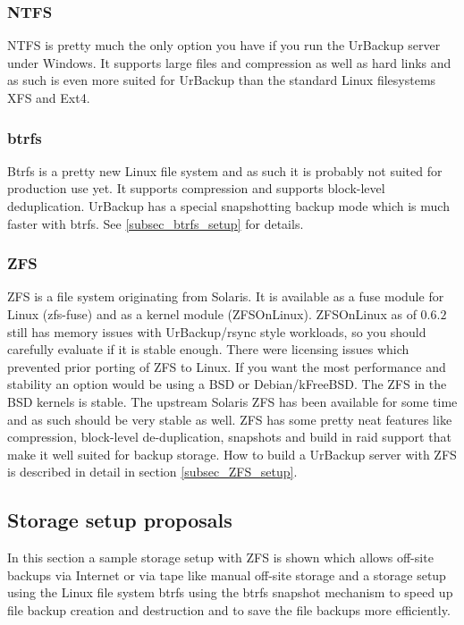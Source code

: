 \documentclass[a4paper,10pt]{article}
\begin{document}
\subsubsection{NTFS}

NTFS is pretty much the only option you have if you run the UrBackup server under Windows. It supports large files and compression as well as hard links and as such is even more suited for UrBackup than the standard Linux filesystems XFS and Ext4. 

\subsubsection{btrfs}

Btrfs is a pretty new Linux file system and as such it is probably not suited for production use yet.
It supports compression and supports block-level deduplication. UrBackup has a special snapshotting backup
mode which is much faster with btrfs. See \ref{subsec_btrfs_setup} for details.

\subsubsection{ZFS}

ZFS is a file system originating from Solaris.
It is available as a fuse module for Linux (zfs-fuse) and as a kernel module (ZFSOnLinux). ZFSOnLinux
as of $0.6.2$ still has memory issues with UrBackup/rsync style workloads, so you should carefully evaluate
if it is stable enough.
There were licensing issues which prevented prior porting of ZFS to Linux.
If you want the most performance and stability an option would be using a BSD or Debian/kFreeBSD.
The ZFS in the BSD kernels is stable. 
The upstream Solaris ZFS has been available for some time and as such should be very stable as well.
ZFS has some pretty neat features like compression, block-level de-duplication, snapshots and build
in raid support that make it well suited for backup storage.
How to build a UrBackup server with ZFS is described in detail in section \ref{subsec_ZFS_setup}.


\subsection{Storage setup proposals}
\label{sec_storage_proposals}

In this section a sample storage setup with ZFS is shown which allows off-site
backups via Internet or via tape like manual off-site storage and a storage setup
using the Linux file system btrfs using the btrfs snapshot mechanism to speed
up file backup creation and destruction and to save the file backups more efficiently.
\end{document}
